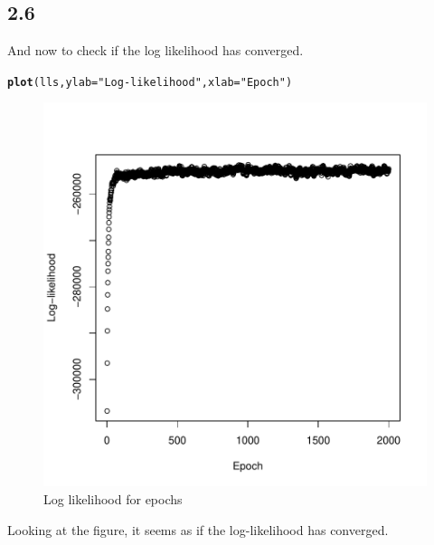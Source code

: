 \documentclass[10pt, a4paper, english]{article}\usepackage[]{graphicx}\usepackage[dvipsnames]{xcolor}
\makeatletter
\def\maxwidth{ %
  \ifdim\Gin@nat@width>\linewidth
    \linewidth
  \else
    \Gin@nat@width
  \fi
}
\newcommand{\hlstr}[1]{\textcolor[rgb]{0.192,0.494,0.8}{#1}}%
\newcommand{\hlstd}[1]{\textcolor[rgb]{0.345,0.345,0.345}{#1}}%
\newcommand{\hlkwc}[1]{\textcolor[rgb]{0.333,0.667,0.333}{#1}}%
\newcommand{\hlkwd}[1]{\textcolor[rgb]{0.737,0.353,0.396}{\textbf{#1}}}%
\newenvironment{kframe}{%
 \def\at@end@of@kframe{}%
 \ifinner\ifhmode%
  \def\at@end@of@kframe{\end{minipage}}%
  \begin{minipage}{\columnwidth}%
 \fi\fi%
 \def\FrameCommand##1{\hskip\@totalleftmargin \hskip-\fboxsep
 \colorbox{shadecolor}{##1}\hskip-\fboxsep
     \hskip-\linewidth \hskip-\@totalleftmargin \hskip\columnwidth}%
 \MakeFramed {\advance\hsize-\width
   \@totalleftmargin\z@ \linewidth\hsize
   \@setminipage}}%
 {\par\unskip\endMakeFramed%
 \at@end@of@kframe}
\newenvironment{knitrout}{}{} %
\makeatother
\begin{document}
\subsection{2.6}
And now to check if the log likelihood has converged.
\begin{knitrout}
\color{fgcolor}\begin{kframe}
\begin{alltt}
\hlkwd{plot}\hlstd{(lls,} \hlkwc{ylab}\hlstd{=}\hlstr{"Log-likelihood"}\hlstd{,} \hlkwc{xlab}\hlstd{=}\hlstr{"Epoch"}\hlstd{)}
\end{alltt}
\end{kframe}\begin{figure}
\includegraphics[width=\maxwidth]{figure/unnamed-chunk-19-1} \caption[Log likelihood for epochs]{Log likelihood for epochs}\label{fig:unnamed-chunk-19}
\end{figure}

\end{knitrout}
Looking at the figure, it seems as if the log-likelihood has converged. 
\end{document}
